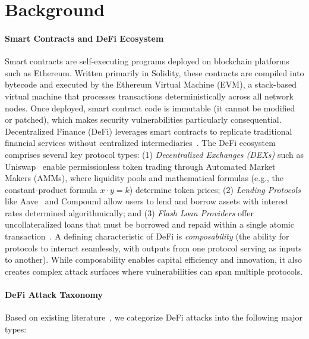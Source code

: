
\section{Background}
\label{sec:background}

\paragraph{\textbf{Smart Contracts and DeFi Ecosystem}}
Smart contracts are self-executing programs deployed on blockchain platforms such as Ethereum. Written primarily in Solidity, these contracts are compiled into bytecode and executed by the Ethereum Virtual Machine (EVM), a stack-based virtual machine that processes transactions deterministically across all network nodes. Once deployed, smart contract code is immutable (it cannot be modified or patched), which makes security vulnerabilities particularly consequential.
Decentralized Finance (DeFi) leverages smart contracts to replicate traditional financial services without centralized intermediaries~\cite{defi2023}. The DeFi ecosystem comprises several key protocol types: (1) \textit{Decentralized Exchanges (DEXs)} such as Uniswap~\cite{uniswapv3} enable permissionless token trading through Automated Market Makers (AMMs), where liquidity pools and mathematical formulas (e.g., the constant-product formula $x \cdot y = k$) determine token prices; (2) \textit{Lending Protocols} like Aave~\cite{aaveflashloan} and Compound allow users to lend and borrow assets with interest rates determined algorithmically; and (3) \textit{Flash Loan Providers} offer uncollateralized loans that must be borrowed and repaid within a single atomic transaction~\cite{qin2020flashloan}.
A defining characteristic of DeFi is \textit{composability} (the ability for protocols to interact seamlessly, with outputs from one protocol serving as inputs to another). While composability enables capital efficiency and innovation, it also creates complex attack surfaces where vulnerabilities can span multiple protocols.

\paragraph{\textbf{DeFi Attack Taxonomy}}

Based on existing literature~\cite{defi2023,scvsurvey2024,taxonomysc2024}, we categorize DeFi attacks into the following major types:

